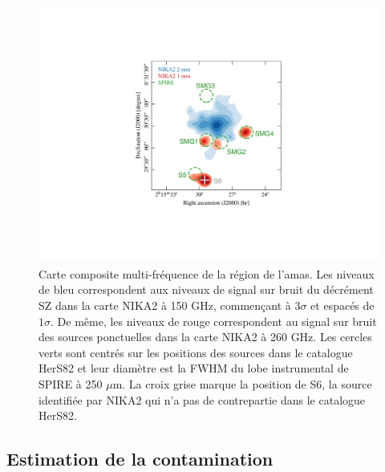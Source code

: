 \begin{figure}[t]
    \centering
    \includegraphics[height=8.5cm, trim={10cm 5cm 8cm 5cm}, clip]{Figures/Chap_actj0215/composite.pdf}
    \caption{%
        Carte composite multi-fréquence de la région de l'amas.
        Les niveaux de bleu correspondent aux niveaux de signal sur bruit du décrément SZ dans la carte NIKA2 à 150 GHz, commençant à $3\sigma$ et espacés de $1\sigma$.
        De même, les niveaux de rouge correspondent au signal sur bruit des sources ponctuelles dans la carte NIKA2 à 260 GHz.
        Les cercles verts sont centrés sur les positions des sources dans le catalogue HerS82 \cite{viero_herschel_2014} et leur diamètre est la FWHM du lobe instrumental de SPIRE à 250 $\mu$m.
        La croix grise marque la position de S6, la source identifiée par NIKA2 qui n'a pas de contrepartie dans le catalogue HerS82.
        }
    \label{fig:act:composite}
\end{figure}

\subsection{Estimation de la contamination}\label{subsec:act:sed}

